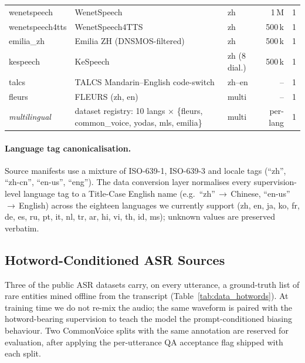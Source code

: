 \begin{table}[t]
\begin{tabular}{p{2.6cm}p{6.0cm}lrr}
    wenetspeech         & WenetSpeech \cite{zhang2022wenetspeech}                         & zh       & 1\,M & 1 \\
    wenetspeech4tts     & WenetSpeech4TTS                                                 & zh       & 500\,k & 1 \\
    emilia\_zh          & Emilia ZH (DNSMOS-filtered) \cite{he2024emilia, reddy2021dnsmos} & zh      & 500\,k & 1 \\
    kespeech            & KeSpeech \cite{tang2021kespeech}                                & zh (8 dial.) & 500\,k & 1 \\
    talcs               & TALCS Mandarin--English code-switch \cite{li2022talcs}          & zh--en   & --   & 1 \\
    fleurs              & FLEURS (zh, en)                                                 & multi    & --   & 1 \\
    \emph{multilingual} & dataset registry: 10 langs $\times$ \{fleurs, common\_voice, yodas, mls, emilia\}
                                                                                          & multi    & per-lang & 1 \\
    \bottomrule
  \end{tabular}
\end{table}

\paragraph{Language tag canonicalisation.}
Source manifests use a mixture of ISO-639-1, ISO-639-3 and locale tags
(``zh'', ``zh-cn'', ``en-us'', ``eng''). The data conversion layer
normalises every supervision-level language tag to a Title-Case
English name (e.g.\ ``zh''\,$\to$\,Chinese, ``en-us''\,$\to$\,English)
across the eighteen languages we currently support
(zh, en, ja, ko, fr, de, es, ru, pt, it, nl, tr, ar, hi, vi, th, id, ms);
unknown values are preserved verbatim.

\subsection{Hotword-Conditioned ASR Sources}
\label{subsec:hotword-sources}

Three of the public ASR datasets carry, on every utterance, a
ground-truth list of rare entities mined offline from the transcript
(Table~\ref{tab:data_hotwords}). At training time we do not re-mix
the audio; the same waveform is paired with the hotword-bearing
supervision to teach the model the prompt-conditioned biasing
behaviour. Two CommonVoice splits with the same annotation are
reserved for evaluation, after applying the per-utterance QA
acceptance flag shipped with each split.

